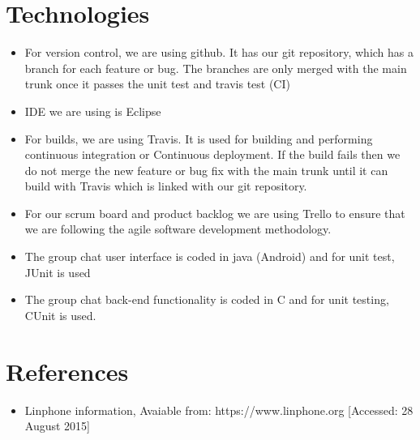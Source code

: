 \documentclass[a4paper]{article}
\begin{document}
\section{Technologies}
\begin{itemize}
\item For version control, we are using github. It has our git repository, which has a branch for each feature or bug. The branches are only merged with the main trunk once it passes the unit test and travis test (CI)\\
\item IDE we are using is Eclipse\\
\item For builds, we are using Travis. It is used for building and performing continuous integration or Continuous deployment. If the build fails then we do not merge the new feature or bug fix with the main trunk until it can build with Travis which is linked with our git repository.\\
\item For our scrum board and product backlog we are using Trello to ensure that we are following the agile software development methodology.\\
\item The group chat user interface is coded in java (Android) and for unit test, JUnit is used\\
\item The group chat back-end functionality is coded in C and for unit testing, CUnit is used.

\end{itemize}

\section{References}
\begin{itemize}
\item Linphone information, Avaiable from: https://www.linphone.org [Accessed: 28 August 2015]
\end{itemize}
\end{document}
